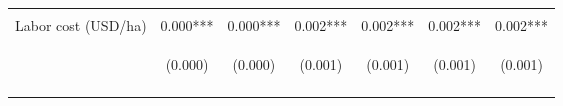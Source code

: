 \begin{center}
\begin{tabular}{lcccccc}
\vspace{4pt} & \begin{footnotesize}[0.004]\end{footnotesize} & \begin{footnotesize}[0.015]\end{footnotesize} & \begin{footnotesize}[0.107]\end{footnotesize} & \begin{footnotesize}[0.514]\end{footnotesize} & \begin{footnotesize}[0.136]\end{footnotesize} & \begin{footnotesize}[0.641]\end{footnotesize} \\
Labor cost (USD/ha) & 0.000*** & 0.000*** & 0.002*** & 0.002*** & 0.002*** & 0.002*** \\
 & \begin{footnotesize}(0.000)\end{footnotesize} & \begin{footnotesize}(0.000)\end{footnotesize} & \begin{footnotesize}(0.001)\end{footnotesize} & \begin{footnotesize}(0.001)\end{footnotesize} & \begin{footnotesize}(0.001)\end{footnotesize} & \begin{footnotesize}(0.001)\end{footnotesize} \\
\vspace{4pt} & \begin{footnotesize}[0.001]\end{footnotesize} & \begin{footnotesize}[0.000]\end{footnotesize} & \begin{footnotesize}[0.004]\end{footnotesize} & \begin{footnotesize}[0.001]\end{footnotesize} & \begin{footnotesize}[0.004]\end{footnotesize} & \begin{footnotesize}[0.001]\end{footnotesize} \\

\end{tabular}
\end{center}
